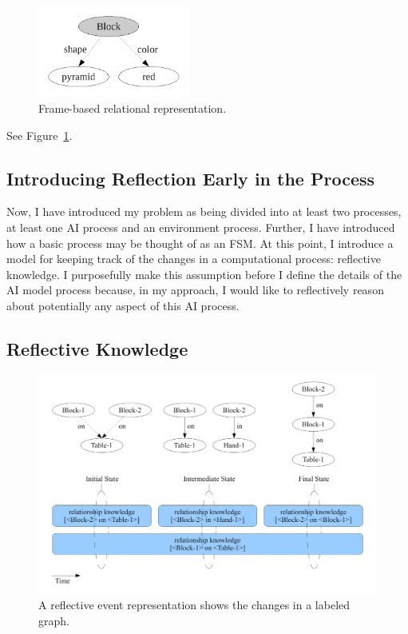 \begin{figure}[bth]
  \center
  \includegraphics[height=3cm]{gfx/frame_representation}
  \caption[Frame-based relational representation]{Frame-based relational representation.}
  \label{fig:frame_representation}
\end{figure}

See Figure~\ref{fig:frame_representation}.

\subsection{Introducing Reflection Early in the Process}
\label{sec:introducing_reflection_early_in_the_process}

Now, I have introduced my problem as being divided into at least two
processes, at least one AI process and an environment process.
Further, I have introduced how a basic process may be thought of as an
\ac{FSM}.  At this point, I introduce a model for keeping track of the
changes in a computational process: reflective knowledge.  I
purposefully make this assumption before I define the details of the
AI model process because, in my approach, I would like to
reflectively reason about potentially any aspect of this AI
process.


\subsection{Reflective Knowledge}

\begin{figure}[bth]
  \center
  \includegraphics[width=12cm]{gfx/reflective_event_representation}
  \caption[A reflective event representation]{A reflective event representation shows the changes in a labeled graph.}
  \label{fig:reflective_event_representation}
\end{figure}


